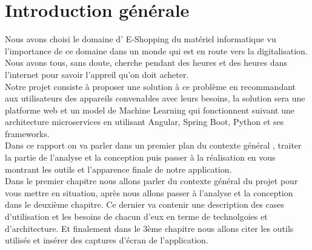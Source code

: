 \renewcommand{\abstractnamefont}{\normalfont\LARGE\bfseries}


\chapter*{Introduction générale}
\begin{spacing}{1}

Nous avons choisi le domaine d' E-Shopping du matériel informatique vu l'importance de ce domaine dans un monde qui est en route vers la digitalisation. Nous avons tous, sans doute, cherche pendant des heures et des heures dans l'internet pour savoir l'appreil qu'on doit acheter. \\

Notre projet consiste à proposer une solution à ce problème en recommandant aux utilisateurs des appareils convenables avec leurs besoins, la solution sera une platforme web et un model de Machine Learning qui fonctionnent suivant une architecture microservices en utilisant Angular, Spring Boot, Python et ses frameworks. \\

Dans ce rapport on va parler dans un premier plan du contexte général , traiter la partie de l’analyse et la conception puis passer à la réalisation en vous montrant les outils et l’apparence finale de notre application. \\

Dans le premier chapitre nous allons parler du contexte général du projet pour vous mettre en situation, après nous allons passer à l’analyse et la conception dans le deuxième chapitre. Ce dernier va contenir une description des cases d'utilisation et les besoins de chacun d’eux en terme  de technolgoies et d'architecture. Et finalement dans le 3ème chapitre nous allons citer les outils utilisés et insérer des captures d’écran de l’application.  \\


\end{spacing} 



